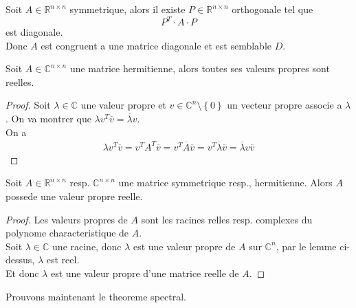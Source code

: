 \documentclass[../main.tex]{subfiles}
\begin{document}
\begin{thm}
Soit $A \in \mathbb{R}^{n\times n}$ symmetrique, alors il existe $P \in \mathbb{R}^{n\times n}$ orthogonale tel que
\[ 
P^{T}\cdot A \cdot P
\]
est diagonale.\\
Donc $A $ est congruent a une matrice diagonale et est semblable $D$.
\end{thm}
\begin{lemma}
Soit $A \in \mathbb{C}^{n\times n}$ une matrice hermitienne, alors toutes ses valeurs propres sont reelles.
\end{lemma}
\begin{proof}
	Soit $\lambda \in \mathbb{C}$ une valeur propre et $v \in \mathbb{C}^{n}\setminus \left\{ 0 \right\} $ un vecteur propre associe a $\lambda$. On va montrer que $\lambda v^{T} \overline{v}= \overline{\lambda} v$.\\
	On a 
	\begin{align*}
	\lambda v^{T} \overline{v} = v^{T} A^{T} \overline{v}= v^{T} \overline{A} \overline{v} = v^{T} \overline{\lambda} \overline{v} = \overline{\lambda }v \overline{v}
	\end{align*}
	
\end{proof}
\begin{crly}
Soit $A \in \mathbb{R}^{n\times n}$ resp. $\mathbb{C}^{n\times n}$ une matrice symmetrique resp., hermitienne. Alors $A$ possede une valeur propre reelle.
\end{crly}
\begin{proof}
Les valeurs propres de $A$ sont les racines relles resp. complexes du polynome characteristique de $A$.\\
Soit $\lambda \in \mathbb{C}$ une racine, donc $\lambda$ est une valeur propre de $A$ sur $\mathbb{C}^{n}$, par le lemme ci-dessus, $\lambda$ est reel.\\ 
Et donc $\lambda$ est une valeur propre d'une matrice reelle de $A$.
\end{proof}
Prouvons maintenant le theoreme spectral.
\end{document}
